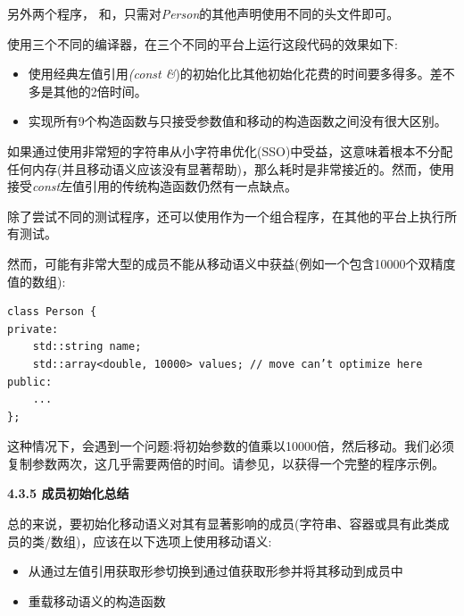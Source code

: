 另外两个程序， {\color{red}{basics/initallperf.cpp}}和{\color{red}{basics/initmoveperf.cpp}}，只需对\textit{Person}的其他声明使用不同的头文件即可。

使用三个不同的编译器，在三个不同的平台上运行这段代码的效果如下:\par

\begin{itemize}
	\item 使用经典左值引用\textit{(const \&})的初始化比其他初始化花费的时间要多得多。差不多是其他的2倍时间。
	\item 实现所有9个构造函数与只接受参数值和移动的构造函数之间没有很大区别。
\end{itemize}

如果通过使用非常短的字符串从小字符串优化(SSO)中受益，这意味着根本不分配任何内存(并且移动语义应该没有显著帮助)，那么耗时是非常接近的。然而，使用接受\textit{const}左值引用的传统构造函数仍然有一点缺点。\par

除了尝试不同的测试程序，还可以使用{\color{red}{basics/initperf.cpp}}作为一个组合程序，在其他的平台上执行所有测试。\par

然而，可能有非常大型的成员不能从移动语义中获益(例如一个包含10000个双精度值的数组):\par
 
\begin{lstlisting}[caption={}]
class Person {
private:
	std::string name;
	std::array<double, 10000> values; // move can’t optimize here
public:
	...
};
\end{lstlisting}

这种情况下，会遇到一个问题:将初始参数的值乘以10000倍，然后移动。我们必须复制参数两次，这几乎需要两倍的时间。请参见{\color{red}{basics/initbigper.cpp}}，以获得一个完整的程序示例。\par

\hspace*{\fill} \par %
\textbf{4.3.5 成员初始化总结}

总的来说，要初始化移动语义对其有显著影响的成员(字符串、容器或具有此类成员的类/数组)，应该在以下选项上使用移动语义:\par

\begin{itemize}
	\item 从通过左值引用获取形参切换到通过值获取形参并将其移动到成员中
	\item 重载移动语义的构造函数
\end{itemize}

